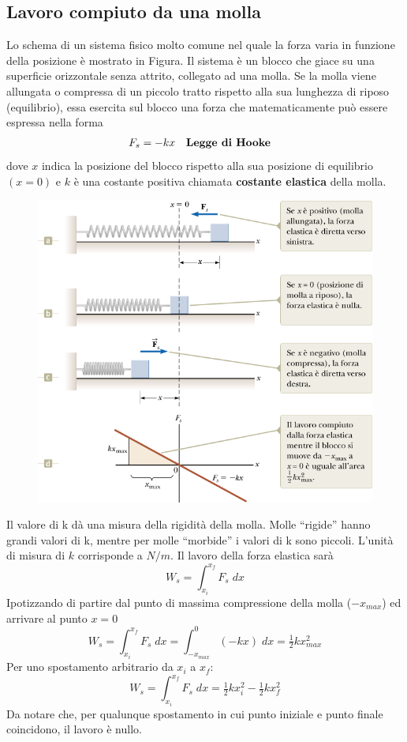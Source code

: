 \documentclass[a4paper,11pt,oneside]{book}
\begin{document}
\subsection{Lavoro compiuto da una molla}
Lo schema di un sistema fisico molto comune nel quale la forza varia in funzione della posizione è mostrato in Figura. Il sistema è un blocco che giace su una superficie orizzontale senza attrito, collegato ad una molla.
Se la molla viene allungata o compressa di un piccolo tratto rispetto alla sua lunghezza di riposo (equilibrio), essa esercita sul blocco una forza che matematicamente può essere espressa nella forma
\begin{align*}
    F_s &= -kx & &\text{\textbf{Legge di Hooke}} 
\end{align*}
dove $x$ indica la posizione del blocco rispetto alla sua posizione di equilibrio $(x = 0)$ e $k$ è una costante positiva chiamata \textbf{costante elastica} della molla.

\newpage
\begin{figure}[h]
    \centering
    \includegraphics[scale=0.4]{lavoro_molla.png}
\end{figure}
Il valore di k dà una misura della rigidità della molla. Molle “rigide” hanno grandi valori di k, mentre per molle “morbide” i valori di k sono piccoli. L'unità di misura di $k$ corrisponde a $N/m$.
Il lavoro della forza elastica sarà
\begin{equation*}
    W_s = \int_{x_i}^{x_f}F_s \;dx
\end{equation*}
Ipotizzando di partire dal punto di massima compressione della molla ($-x_{max}$) ed arrivare al punto $x=0$
\begin{equation*}
    W_s = \int_{x_i}^{x_f}F_s \; dx = \int_{-x_{max}}^{0} (-kx) \; dx = \tfrac{1}{2}kx^2_{max}
\end{equation*}
Per uno spostamento arbitrario da $x_i$ a $x_f$:
\begin{equation*}
    W_s = \int_{x_i}^{x_f}F_s \; dx = \tfrac{1}{2} kx_i^2 - \tfrac{1}{2}kx_f^2
\end{equation*}
Da notare che, per qualunque spostamento in cui punto iniziale e punto finale coincidono, il lavoro è nullo.
\end{document}
